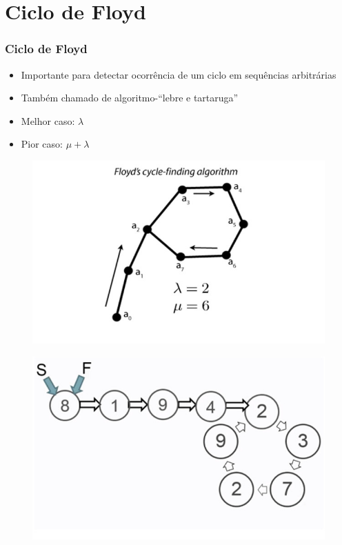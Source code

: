 \documentclass{beamer}
\begin{document}
\section{Ciclo de Floyd}
\begin{frame}
\frametitle{Ciclo de Floyd}
  \begin{itemize}
    \item Importante para detectar ocorrência de um ciclo em sequências arbitrárias
    \item Também chamado de algoritmo-``lebre e tartaruga''
    \item Melhor caso: $\lambda$
    \item Pior caso: $\mu + \lambda$
  \end{itemize}

  \begin{figure}
    \includegraphics[scale=0.2]{floyd_cycle}
  \end{figure}
\end{frame}
\begin{frame}
  \begin{figure}
    \includegraphics[scale=0.3]{floyd_step1}
  \end{figure}
\end{frame}
\end{document}
